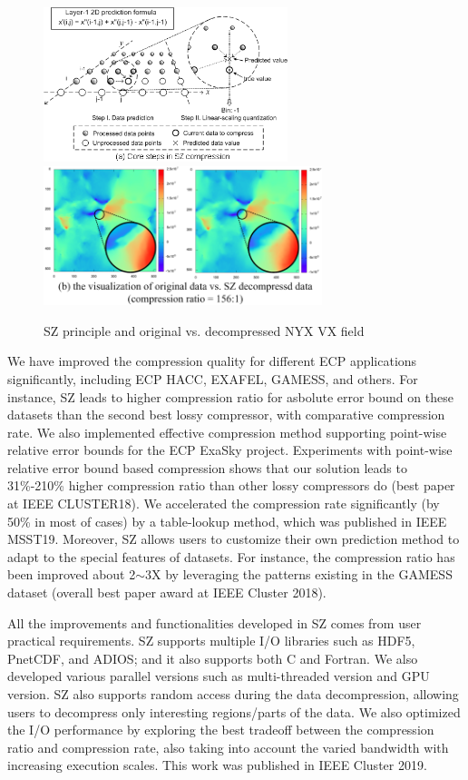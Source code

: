 \begin{figure}[htb]
\centering
\includegraphics[width=2.8in]{projects/2.3.4-DataViz/2.3.4.14-VeloC-SZ/sz-illu.png}
\includegraphics[width=3.2in]{projects/2.3.4-DataViz/2.3.4.14-VeloC-SZ/Visual-quality-NYX-SZ.png}
\vspace{-2mm}
	\caption{\label{fig:sz-principle} SZ principle and  original vs. decompressed NYX VX field}
\end{figure}

We have improved the compression quality for different ECP applications significantly, including ECP HACC, EXAFEL, GAMESS, and others. For instance, SZ leads to higher compression ratio for asbolute error bound on these datasets than the second best lossy compressor, with comparative compression rate. We also implemented effective compression method supporting point-wise relative error bounds for the ECP ExaSky project. Experiments with point-wise relative error bound based compression shows that our solution leads to 31\%-210\% higher compression ratio than other lossy compressors do (best paper at IEEE CLUSTER18). We accelerated the compression rate significantly (by 50\% in most of cases) by a table-lookup method, which was published in IEEE MSST19. 
Moreover, SZ allows users to customize their own prediction method to adapt to the special features of datasets. For instance, the compression ratio has been improved about 2$\sim$3X by leveraging the patterns existing in the GAMESS dataset (overall best paper award at IEEE Cluster 2018).  

All the improvements and functionalities developed in SZ comes from user practical requirements. SZ supports multiple I/O libraries such as HDF5, PnetCDF, and ADIOS; and it also supports both C and Fortran. We also developed various parallel versions such as multi-threaded version and GPU version. SZ also supports random access during the data decompression, allowing users to decompress only interesting regions/parts of the data. We also optimized the I/O performance by exploring the best tradeoff between the compression ratio and compression rate, also taking into account the varied bandwidth with increasing execution scales. This work was published in IEEE Cluster 2019.

